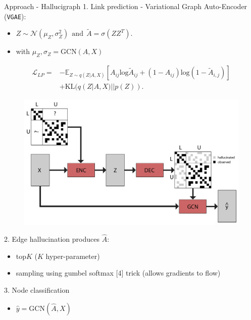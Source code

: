 \documentclass[final]{beamer}
\begin{document}
\begin{frame}[fragile]{}
\begin{textblock}{\colwidth}
\begin{paddedBlock}{Approach - Hallucigraph}
\alert{1. Link prediction - Variational Graph Auto-Encoder (\texttt{VGAE}):}
\begin{itemize}
  \item $Z\sim\mathcal{N}(\mu_Z,\sigma_Z^2)\ \ \mathrm{and}\ \ \tilde{A}=\sigma(ZZ^T).$
  \item with $\mu_Z,\sigma_Z=\mathrm{GCN}(A, X)$
\end{itemize}
\begin{align*}
\mathcal{L}_{LP}=&-\mathbb{E}_{Z\sim q(Z|A,X)}[A_{ij}\mathrm{log}\tilde{A}_{ij}+(1-A_{ij})\mathrm{log}(1-\tilde{A}_{i,j})]\\
&+\mathrm{KL}(q(Z|A,X)||p(Z)).
\end{align*}
\begin{figure}
    \centering
    \includegraphics[width=.8\textwidth]{img/model_big.pdf}
    \label{fig:big}
\end{figure}
\alert{2. Edge hallucination}
  produces $\hat{A}$:
  \begin{itemize}
    \item top$K$ ($K$ hyper-parameter)
    \item sampling using gumbel softmax [4] trick (allows gradients to flow)
  \end{itemize}
\alert{3. Node classification}
\begin{itemize}
	\item $\hat{y} = \mathrm{GCN}(\hat{A}, X)$
\end{itemize}

\end{paddedBlock}
\end{textblock}



\end{frame}
\end{document}
